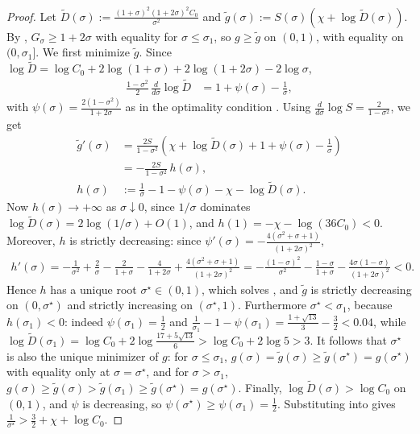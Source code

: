\documentclass[11pt]{article}
\begin{document}
\begin{proof}
    Let $\tilde D(\sigma) := \frac{(1+\sigma)^2(1+2\sigma)^2C_0}{\sigma^2}$ and $\tilde g(\sigma) := S(\sigma)\left(\chi + \log\tilde D(\sigma)\right)$.
    By , $G_\sigma\geq1+2\sigma$ with equality for $\sigma\leq\sigma_1$, so $g\geq\tilde g$ on $(0,1)$, with equality on $(0,\sigma_1]$.
    We first minimize $\tilde g$.
    Since $\log\tilde D = \log C_0 + 2\log(1+\sigma) + 2\log(1+2\sigma) - 2\log\sigma$,
    \begin{align}
        \frac{1-\sigma^2}{2}\,\frac{d}{d\sigma}\log\tilde D &= 1 + \psi(\sigma) - \frac{1}{\sigma},
    \end{align}
    with $\psi(\sigma) = \frac{2(1-\sigma^2)}{1+2\sigma}$ as in the optimality condition .
    Using $\frac{d}{d\sigma}\log S = \frac{2}{1-\sigma^2}$, we get
    \begin{align}
        \tilde g'(\sigma) &= \frac{2S}{1-\sigma^2}\left(\chi + \log\tilde D(\sigma) + 1 + \psi(\sigma) - \frac{1}{\sigma}\right) \\
        &= -\frac{2S}{1-\sigma^2}\,h(\sigma), \\
        h(\sigma) &:= \frac{1}{\sigma} - 1 - \psi(\sigma) - \chi - \log\tilde D(\sigma).
    \end{align}
    Now $h(\sigma)\to+\infty$ as $\sigma\downarrow0$, since $1/\sigma$ dominates $\log\tilde D(\sigma) = 2\log(1/\sigma) + O(1)$, and $h(1) = -\chi - \log(36C_0) < 0$.
    Moreover, $h$ is strictly decreasing: since $\psi'(\sigma) = -\frac{4(\sigma^2+\sigma+1)}{(1+2\sigma)^2}$,
    \begin{align}
        h'(\sigma) = -\frac{1}{\sigma^2} + \frac{2}{\sigma} - \frac{2}{1+\sigma} - \frac{4}{1+2\sigma} + \frac{4(\sigma^2+\sigma+1)}{(1+2\sigma)^2}
        = -\frac{(1-\sigma)^2}{\sigma^2} - \frac{1-\sigma}{1+\sigma} - \frac{4\sigma(1-\sigma)}{(1+2\sigma)^2} < 0.
    \end{align}
    Hence $h$ has a unique root $\sigma^\star\in(0,1)$, which solves , and $\tilde g$ is strictly decreasing on $(0,\sigma^\star)$ and strictly increasing on $(\sigma^\star,1)$.
    Furthermore $\sigma^\star<\sigma_1$, because $h(\sigma_1)<0$: indeed $\psi(\sigma_1) = \frac{1}{2}$ and $\frac{1}{\sigma_1} - 1 - \psi(\sigma_1) = \frac{1+\sqrt{13}}{3} - \frac{3}{2} < 0.04$, while $\log\tilde D(\sigma_1) = \log C_0 + 2\log\frac{17+5\sqrt{13}}{6} > \log C_0 + 2\log 5 > 3$.
    It follows that $\sigma^\star$ is also the unique minimizer of $g$: for $\sigma\leq\sigma_1$, $g(\sigma) = \tilde g(\sigma)\geq\tilde g(\sigma^\star) = g(\sigma^\star)$ with equality only at $\sigma = \sigma^\star$, and for $\sigma>\sigma_1$, $g(\sigma)\geq\tilde g(\sigma)>\tilde g(\sigma_1)\geq\tilde g(\sigma^\star) = g(\sigma^\star)$.
    Finally, $\log\tilde D(\sigma)>\log C_0$ on $(0,1)$, and $\psi$ is decreasing, so $\psi(\sigma^\star)\geq\psi(\sigma_1) = \frac{1}{2}$.
    Substituting into  gives $\frac{1}{\sigma^\star} > \frac{3}{2} + \chi + \log C_0$.
\end{proof}
\end{document}
